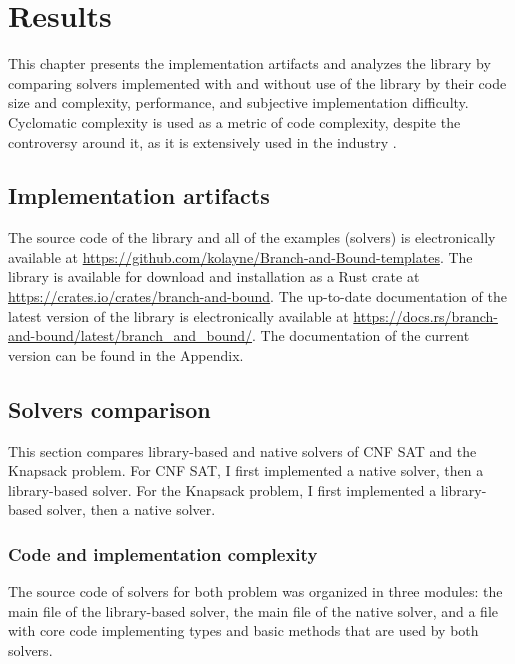 \chapter{Results}
\label{chap:res}

This chapter presents the implementation artifacts and analyzes the library by comparing
solvers implemented with and without use of the library by their code size and
complexity, performance, and subjective implementation difficulty. Cyclomatic complexity
\cite{ebert2016cyclomatic} is used as a metric of code complexity,
despite the controversy around it, as it is extensively used in the industry
\cite{ebert2016cyclomatic}.

\section{Implementation artifacts}

The source code of the library and all of the examples (solvers) is electronically
available at \url{https://github.com/kolayne/Branch-and-Bound-templates}. The library
is available for download and installation as a Rust crate at
\url{https://crates.io/crates/branch-and-bound}.
The up-to-date documentation of the latest version of the library is electronically
available at \url{https://docs.rs/branch-and-bound/latest/branch_and_bound/}.
The documentation of the current version can be found in the Appendix.

\section{Solvers comparison}

This section compares library-based and native solvers of CNF SAT and the Knapsack problem.
For CNF SAT, I first implemented a native solver, then a library-based
solver. For the Knapsack problem, I first implemented a library-based solver, then a
native solver.

\subsection{Code and implementation complexity}

The source code of solvers for both problem was organized in three modules:
the main file of the library-based solver, the main file of the native solver, and a file
with core code implementing types and basic methods that are used by both solvers.


